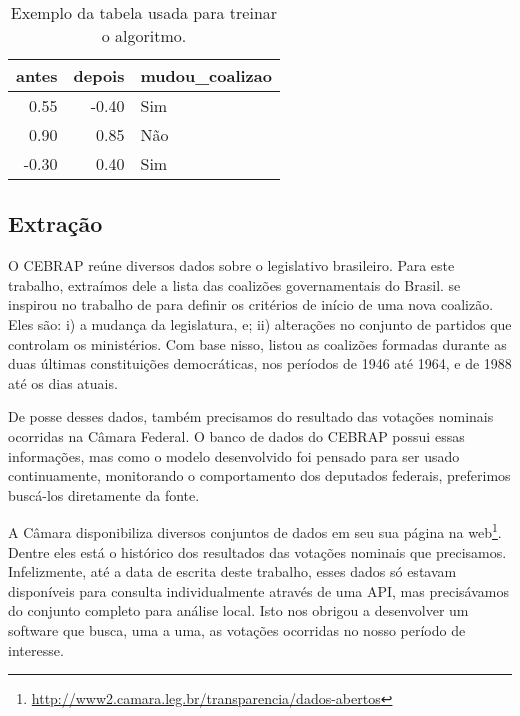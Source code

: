 \documentclass[a4paper,titlepage]{ppgi}\usepackage[]{graphicx}\usepackage[]{color}
\newenvironment{knitrout}{}{} %
\begin{document}
\begin{table}
\centering
\begin{knitrout}
\color{fgcolor}
\begin{tabular}{r|r|l}
\hline
antes & depois & mudou\_coalizao\\
\hline
0.55 & -0.40 & Sim\\
\hline
0.90 & 0.85 & Não\\
\hline
-0.30 & 0.40 & Sim\\
\hline
\end{tabular}


\end{knitrout}
\caption{Exemplo da tabela usada para treinar o algoritmo.}
\label{table:dataset-final}
\end{table}

\subsection{Extração}
\label{sec:miolo:extracao}

O \gls{CEBRAP} reúne diversos dados sobre o legislativo brasileiro. Para este
trabalho, extraímos dele a lista das coalizões governamentais do Brasil.
 se inspirou no trabalho de 
para definir os critérios de início de uma nova coalizão. Eles são: i) a
mudança da legislatura, e; ii) alterações no conjunto de partidos que controlam
os ministérios. Com base nisso, \citeauthor{Figueiredo2007} listou as coalizões
formadas durante as duas últimas constituições democráticas, nos períodos de
1946 até 1964, e de 1988 até os dias atuais.  

De posse desses dados, também precisamos do resultado das votações nominais
ocorridas na Câmara Federal. O banco de dados do \gls{CEBRAP} possui essas
informações, mas como o modelo desenvolvido foi pensado para ser usado
continuamente, monitorando o comportamento dos deputados federais, preferimos
buscá-los diretamente da fonte.

A Câmara disponibiliza diversos conjuntos de dados em seu sua página na
web\footnote{\url{http://www2.camara.leg.br/transparencia/dados-abertos}}.
Dentre eles está o histórico dos resultados das votações nominais que
precisamos. Infelizmente, até a data de escrita deste trabalho, esses dados só
estavam disponíveis para consulta individualmente através de uma \gls{API}, mas
precisávamos do conjunto completo para análise local.  Isto nos obrigou a
desenvolver um software que busca, uma a uma, as votações ocorridas no nosso
período de interesse.
\end{document}
